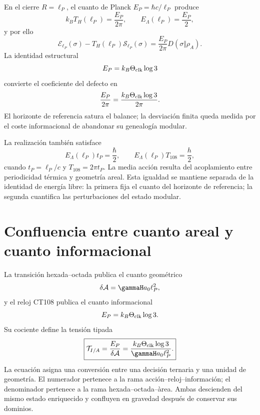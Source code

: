 En el cierre \(R=\ell_P\), el cuanto de Planck
\(E_P=\hbar c/\ell_P\) produce
\begin{equation}
 k_BT_H(\ell_P)=\frac{E_P}{2\pi},
 \qquad
 E_\Lambda(\ell_P)=\frac{E_P}{2},
 \label{eq:rm-info-planck-horizon-data}
\end{equation}
y por ello
\begin{equation}
 \boxed{
 \mathcal E_{\ell_P}(\sigma)
 -T_H(\ell_P)\mathcal S_{\ell_P}(\sigma)
 =\frac{E_P}{2\pi}D(\sigma\Vert\rho_A).}
 \label{eq:rm-info-planck-free-energy}
\end{equation}
La identidad estructural
\begin{equation}
 E_P=k_B\Theta_{\rm clk}\log3
 \label{eq:rm-info-planck-trit}
\end{equation}
convierte el coeficiente del defecto en
\begin{equation}
 \frac{E_P}{2\pi}
 =\frac{k_B\Theta_{\rm clk}\log3}{2\pi}.
 \label{eq:rm-info-trit-free-energy}
\end{equation}
El horizonte de referencia satura el balance; la desviaci\'on finita queda
medida por el coste informacional de abandonar su genealog\'ia modular.

La realizaci\'on tambi\'en satisface
\begin{equation}
 E_\Lambda(\ell_P)t_P=\frac{\hbar}{2},
 \qquad
 E_\Lambda(\ell_P)T_{108}=\frac h2,
 \label{eq:rm-info-half-action}
\end{equation}
cuando \(t_P=\ell_P/c\) y \(T_{108}=2\pi t_P\). La media acci\'on
resulta del acoplamiento entre periodicidad t\'ermica y geometr\'ia areal.
Esta igualdad se mantiene separada de la identidad de energ\'ia libre: la
primera fija el cuanto del horizonte de referencia; la segunda cuantifica
las perturbaciones del estado modular.

\section{Confluencia entre cuanto areal y cuanto informacional}

La transici\'on hexada--octada publica el cuanto geom\'etrico
\begin{equation}
 \delta\mathcal A
 =\gammaH a_0\ell_P^2,
 \label{eq:rm-info-area-quantum}
\end{equation}
y el reloj CT108 publica el cuanto informacional
\begin{equation}
 E_P=k_B\Theta_{\rm clk}\log3.
 \label{eq:rm-info-energy-quantum}
\end{equation}
Su cociente define la tensi\'on tipada
\begin{equation}
 \boxed{
 \mathcal T_{I/A}
 =\frac{E_P}{\delta\mathcal A}
 =\frac{k_B\Theta_{\rm clk}\log3}
 {\gammaH a_0\ell_P^2}.}
 \label{eq:rm-info-tension-information-area}
\end{equation}
La ecuaci\'on asigna una conversi\'on entre una decisi\'on ternaria y una
unidad de geometr\'ia. El numerador pertenece a la rama
acci\'on--reloj--informaci\'on; el denominador pertenece a la rama
hexada--octada--\`area. Ambas descienden del mismo estado enriquecido y
confluyen en gravedad despu\'es de conservar sus dominios.

